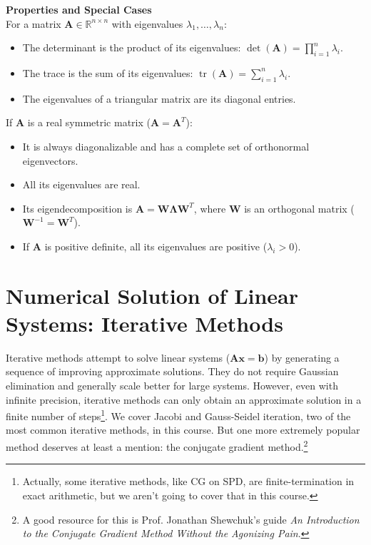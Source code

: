 \begin{theoremBox}
    \textbf{Properties and Special Cases} \\
    For a matrix $\mathbf{A} \in \mathbb{R}^{n \times n}$ with eigenvalues $\lambda_1, \dots, \lambda_n$:
    \begin{itemize}
        \item The determinant is the product of its eigenvalues: $\det(\mathbf{A}) = \prod_{i=1}^n \lambda_i$.
        \item The trace is the sum of its eigenvalues: $\operatorname{tr}(\mathbf{A}) = \sum_{i=1}^n \lambda_i$.
        \item The eigenvalues of a triangular matrix are its diagonal entries.
    \end{itemize}
    If $\mathbf{A}$ is a real symmetric matrix ($\mathbf{A} = \mathbf{A}^T$):
    \begin{itemize}
        \item It is always diagonalizable and has a complete set of orthonormal eigenvectors.
        \item All its eigenvalues are real.
        \item Its eigendecomposition is $\mathbf{A} = \mathbf{W} \mathbf{\Lambda} \mathbf{W}^T$, where $\mathbf{W}$ is an orthogonal matrix ($\mathbf{W}^{-1} = \mathbf{W}^T$).
        \item If $\mathbf{A}$ is positive definite, all its eigenvalues are positive ($\lambda_i > 0$).
    \end{itemize}
\end{theoremBox}


\section{Numerical Solution of Linear Systems: Iterative Methods}
Iterative methods attempt to solve linear systems ($\mathbf{A}\mathbf{x} = \mathbf{b}$) by generating a sequence of improving approximate solutions. They do not require Gaussian elimination and generally scale better for large systems. However, even with infinite precision, iterative methods can only obtain an approximate solution in a finite number of steps\footnote{Actually, some iterative methods, like CG on SPD, are finite-termination in exact arithmetic, but we aren't going to cover that in this course.}. We cover Jacobi and Gauss-Seidel iteration, two of the most common iterative methods, in this course. But one more extremely popular method deserves at least a mention: the conjugate gradient method.\footnote{A good resource for this is Prof. Jonathan Shewchuk's guide \textit{An Introduction to the Conjugate Gradient Method Without the Agonizing Pain}.\autocite{shewchuk1994}}

